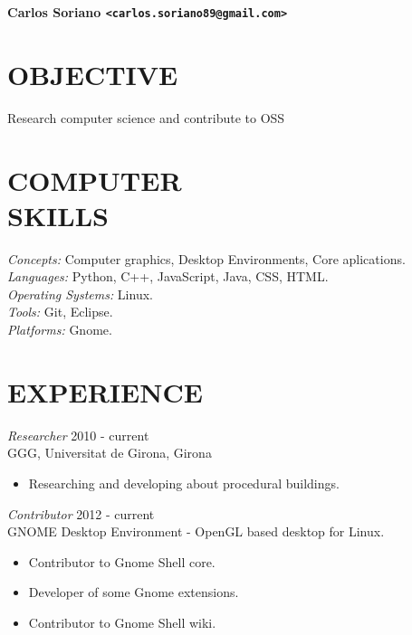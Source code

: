 \documentclass[margin]{res}
\begin{document}
\moveleft\hoffset\vbox{\LARGE\bf Carlos Soriano \large\tt <carlos.soriano89@gmail.com>}

\begin{resume}
 
\section{\small OBJECTIVE}
                Research computer science and contribute to OSS
 

\section{\small COMPUTER \\ SKILLS}
                {\sl Concepts:} Computer graphics, Desktop Environments, Core aplications. \\
                {\sl Languages:} Python, C++, JavaScript, Java, CSS, HTML. \\
                {\sl Operating Systems:} Linux. \\
                {\sl Tools:} Git, Eclipse. \\
                {\sl Platforms:} Gnome. \\
 
\section{\small EXPERIENCE} {\sl Researcher} \hfill 2010 - current \\
                GGG, Universitat de Girona, Girona
                \begin{itemize}  \itemsep -2pt
                \item Researching and developing about procedural buildings.
                \end{itemize}
                
                {\sl Contributor} \hfill 2012 - current \\
                GNOME Desktop Environment - OpenGL based desktop for Linux.
                \begin{itemize} \itemsep -2pt
                \item Contributor to Gnome Shell core.
                \item Developer of some Gnome extensions.
                \item Contributor to Gnome Shell wiki.
                \end{itemize}
                

\end{resume}
\end{document}
